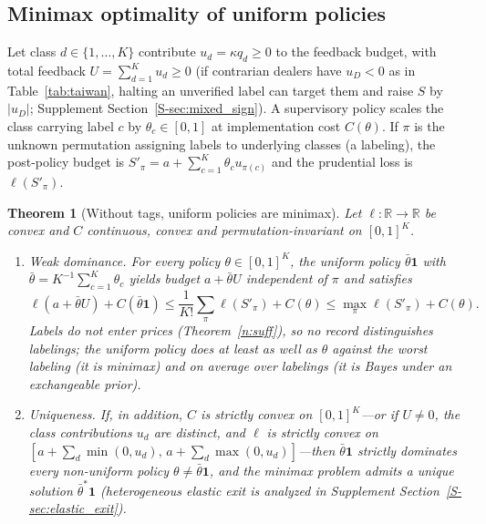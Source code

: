 \documentclass[11pt,letterpaper]{article}
\newtheorem{theorem}{Theorem}[section]
\theoremstyle{definition}
\begin{document}
\subsection{Minimax optimality of uniform policies}

Let class $d \in \{1, \dots, K\}$ contribute $u_d = \kappa q_d \ge 0$ to the feedback budget, with total feedback $U = \sum_{d=1}^K u_d \ge 0$ (if contrarian dealers have $u_D < 0$ as in Table~\ref{tab:taiwan}, halting an unverified label can target them and raise $S$ by $|u_D|$; Supplement Section~\ref{S-sec:mixed_sign}). A supervisory policy scales the class carrying label $c$ by $\theta_c \in [0, 1]$ at implementation cost $C(\theta)$. If $\pi$ is the unknown permutation assigning labels to underlying classes (a labeling), the post-policy budget is $S'_\pi = a + \sum_{c=1}^K \theta_c u_{\pi(c)}$ and the prudential loss is $\ell(S'_\pi)$.

\begin{theorem}[Without tags, uniform policies are minimax]\label{n:minimax}
Let $\ell:\mathbb{R}\to\mathbb{R}$ be convex and $C$ continuous, convex and permutation-invariant on $[0,1]^K$.
\begin{enumerate}
  \item[(i)] \emph{Weak dominance.} For every policy $\theta \in [0, 1]^K$, the uniform policy $\bar{\theta}\mathbf{1}$ with $\bar{\theta} = K^{-1}\sum_{c=1}^K \theta_c$ yields budget $a + \bar{\theta} U$ independent of $\pi$ and satisfies
  \[
    \ell(a + \bar{\theta} U) + C(\bar{\theta}\mathbf{1})
    \le \frac{1}{K!} \sum_{\pi} \ell(S'_\pi) + C(\theta)
    \le \max_{\pi} \ell(S'_\pi) + C(\theta).
  \]
  Labels do not enter prices (Theorem~\ref{n:suff}), so no record distinguishes labelings; the uniform policy does at least as well as $\theta$ against the worst labeling (it is minimax) and on average over labelings (it is Bayes under an exchangeable prior).
  \item[(ii)] \emph{Uniqueness.} If, in addition, $C$ is strictly convex on $[0, 1]^K$---or if $U \neq 0$, the class contributions $u_d$ are distinct, and $\ell$ is strictly convex on $[a + \sum_d \min(0, u_d),\, a + \sum_d \max(0, u_d)]$---then $\bar{\theta}\mathbf{1}$ strictly dominates every non-uniform policy $\theta \neq \bar{\theta}\mathbf{1}$, and the minimax problem admits a unique solution $\bar{\theta}^*\mathbf{1}$ (heterogeneous elastic exit is analyzed in Supplement Section~\ref{S-sec:elastic_exit}).
\end{enumerate}
\end{theorem}
\end{document}
